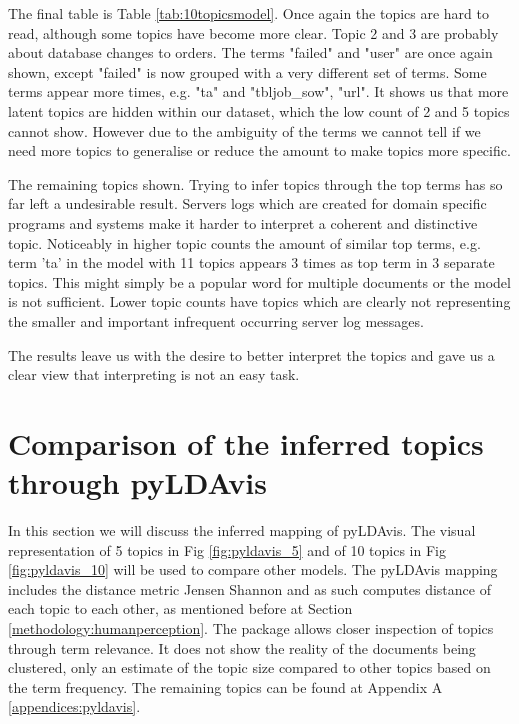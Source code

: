 The final table is Table \ref{tab:10topicsmodel}. Once again the topics are hard to read, although some topics have become more clear. Topic 2 and 3 are probably about database changes to orders. The terms "failed" and "user" are once again shown, except "failed" is now grouped with a very different set of terms. Some terms appear more times, e.g. "ta" and "tbljob\_sow", "url". It shows us that more latent topics are hidden within our dataset, which the low count of 2 and 5 topics cannot show. However due to the ambiguity of the terms we cannot tell if we need more topics to generalise or reduce the amount to make topics more specific.

The remaining topics shown. Trying to infer topics through the top terms has so far left a undesirable result. Servers logs which are created for domain specific programs and systems make it harder to interpret a coherent and distinctive topic. Noticeably in higher topic counts the amount of similar top terms, e.g. term 'ta' in the model with 11 topics appears 3 times as top term in 3 separate topics. This might simply be a popular word for multiple documents or the model is not sufficient. Lower topic counts have topics which are clearly not representing the smaller and important infrequent occurring server log messages.

The results leave us with the desire to better interpret the topics and gave us a clear view that interpreting is not an easy task.

\FloatBarrier
\section{Comparison of the inferred topics through pyLDAvis}\label{results:pyldavis}
In this section we will discuss the inferred mapping of pyLDAvis. The visual representation of 5 topics in Fig \ref{fig:pyldavis_5} and of 10 topics in Fig \ref{fig:pyldavis_10} will be used to compare other models. The pyLDAvis mapping includes the distance metric Jensen Shannon and as such computes distance of each topic to each other, as mentioned before at Section \ref{methodology:humanperception}. The package allows closer inspection of topics through term relevance. It does not show the reality of the documents being clustered, only an estimate of the topic size compared to other topics based on the term frequency. The remaining topics can be found at Appendix A \ref{appendices:pyldavis}. 

